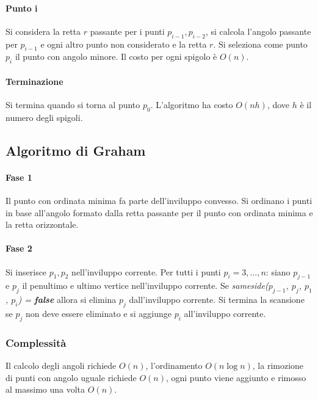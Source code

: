 \paragraph{Punto i}
Si considera la retta $r$ passante per i punti $p_{i-1}, p_{i-2}$, si calcola l'angolo passante per $p_{i-1}$ e ogni altro punto non considerato e la retta $r$. Si  seleziona come punto
$p_i$ il punto con angolo minore. Il costo per ogni spigolo \`e $O(n)$.
\paragraph{Terminazione}
Si termina quando si torna al punto $p_0$. L'algoritmo ha costo $O(nh)$, dove $h$ \`e il numero degli spigoli.
\subsection{Algoritmo di Graham}
\paragraph{Fase 1}
Il punto con ordinata minima fa parte dell'inviluppo convesso. Si ordinano i punti in base all'angolo formato dalla retta passante per il punto con ordinata minima e la retta 
orizzontale.
\paragraph{Fase 2}
Si inserisce $p_1, p_2$ nell'inviluppo corrente. Per tutti i punti $p_i = 3, \dots, n$: siano $p_{j-1}$ e $p_j$ il penultimo e ultimo vertice nell'inviluppo corrente. Se 
\emph{sameside($p_{j-1}$, $p_j$, $p_1$, $p_i$) = \textbf{false}} allora si elimina $p_j$ dall'inviluppo corrente. Si termina la scansione se $p_j$ non deve essere eliminato e si
aggiunge $p_i$ all'inviluppo corrente.

\subsubsection{Complessit\`a}
Il calcolo degli angoli richiede $O(n)$, l'ordinamento $O(n\log n)$, la rimozione di punti con angolo uguale richiede $O(n)$, ogni punto viene aggiunto e rimosso al massimo una 
volta $O(n)$.
